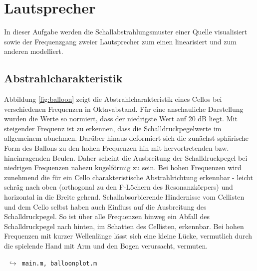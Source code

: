 \newcommand{\files}[1]{
    \hfill
    \mbox{
        $\hookrightarrow$
        \texttt{#1}
    }
}

\section{Lautsprecher}
\label{sec:1}
In dieser Aufgabe werden die Schallabstrahlungsmuster einer Quelle visualisiert sowie der Frequenzgang zweier Lautsprecher zum einen linearisiert und zum anderen modelliert.


\subsection{Abstrahlcharakteristik}
\label{subsec:a}
Abbildung \ref{fig:balloon} zeigt die Abstrahlcharakteristik eines Cellos bei verschiedenen Frequenzen in Oktavabstand.
Für eine anschauliche Darstellung wurden die Werte so normiert, dass der niedrigste Wert auf 20 dB liegt.
Mit steigender Frequenz ist zu erkennen, dass die Schalldruckpegelwerte im allgemeinem abnehmen.
Darüber hinaus deformiert sich die zunächst sphärische Form des Ballons zu den hohen Frequenzen hin mit hervortretenden bzw. hineinragenden Beulen.
Daher scheint die Ausbreitung der Schalldruckpegel bei niedrigen Frequenzen nahezu kugelförmig zu sein.
Bei hohen Frequenzen wird zunehmend die für ein Cello charakteristische Abstrahlrichtung erkennbar - leicht schräg nach oben (orthogonal zu den F-Löchern des Resonanzkörpers) und horizontal in die Breite gehend.
Schallabsorbierende Hindernisse vom Cellisten und dem Cello selbst haben auch Einfluss auf die Ausbreitung des Schalldruckpegel.
So ist über alle Frequenzen hinweg ein Abfall des Schalldruckpegel nach hinten, im Schatten des Cellisten, erkennbar.
Bei hohen Frequenzen mit kurzer Wellenlänge lässt sich eine kleine Lücke, vermutlich durch die spielende Hand mit Arm und den Bogen verursacht, vermuten.
\files{main.m, balloonplot.m}


